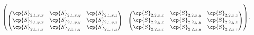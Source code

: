 \begin{refsection}
\begin{equation}
\begin{gathered}
\begin{pmatrix}
        \\
        \begin{pmatrix}
            \cp{S}_{2, 1, x, x} & \cp{S}_{2, 1, x, y} & \cp{S}_{2, 1, x, z} \\
            \cp{S}_{2, 1, y, x} & \cp{S}_{2, 1, y, y} & \cp{S}_{2, 1, y, z} \\
            \cp{S}_{2, 1, z, x} & \cp{S}_{2, 1, z, y} & \cp{S}_{2, 1, z, z} \\
        \end{pmatrix}
        &
        \begin{pmatrix}
            \cp{S}_{2, 2, x, x} & \cp{S}_{2, 2, x, y} & \cp{S}_{2, 2, x, z} \\
            \cp{S}_{2, 2, y, x} & \cp{S}_{2, 2, y, y} & \cp{S}_{2, 2, y, z} \\
            \cp{S}_{2, 2, z, x} & \cp{S}_{2, 2, z, y} & \cp{S}_{2, 2, z, z} \\
        \end{pmatrix}
    \end{pmatrix}
    \text{.}
    \end{gathered}
    \label{eq:matrix_of_matrices}
\end{equation}


\end{refsection}
